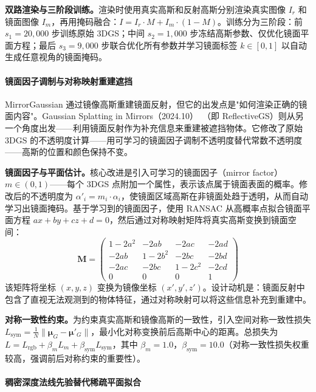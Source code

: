 \textbf{双路渲染与三阶段训练。}渲染时使用真实高斯和反射高斯分别渲染真实图像 $I_r$ 和镜面图像 $I_m$，再用掩码融合：$I = I_r \cdot M + I_m \cdot (1-M)$。训练分为三阶段：前 $s_1=20{,}000$ 步训练原始 3DGS；中间 $s_2=1{,}000$ 步冻结高斯参数、仅优化镜面平面方程；最后 $s_3=9{,}000$ 步联合优化所有参数并学习镜面标签 $k \in [0,1]$ 以自动生成任意视角的镜面掩码。

\paragraph{镜面因子调制与对称映射重建遮挡}

MirrorGaussian 通过镜像高斯重建镜面反射，但它的出发点是"如何渲染正确的镜面内容"。Gaussian Splatting in Mirrors（2024.10）~\cite{2410_01614}（即 ReflectiveGS）则从另一个角度出发——利用镜面反射作为补充信息来重建被遮挡物体。它修改了原始 3DGS 的不透明度计算——用可学习的镜面因子调制不透明度替代常数不透明度——高斯的位置和颜色保持不变。

\textbf{镜面因子与平面估计。}核心改进是引入可学习的镜面因子（mirror factor）$m \in (0,1)$——每个 3DGS 点附加一个属性，表示该点属于镜面表面的概率。修改后的不透明度为 $\alpha'_i = m_i \cdot \alpha_i$，使镜面区域高斯在非镜面处趋于透明，从而自动学习出镜面掩码。基于学习到的镜面因子，使用 RANSAC 从高概率点拟合镜面平面方程 $ax + by + cz + d = 0$，然后通过对称映射矩阵将真实高斯变换到镜面空间：
$$\mathbf{M} = \begin{pmatrix} 1-2a^2 & -2ab & -2ac & -2ad \\ -2ab & 1-2b^2 & -2bc & -2bd \\ -2ac & -2bc & 1-2c^2 & -2cd \\ 0 & 0 & 0 & 1 \end{pmatrix}$$
该矩阵将坐标 $(x,y,z)$ 变换为镜像坐标 $(x',y',z')$。设计动机是：镜面反射中包含了直视无法观测到的物体特征，通过对称映射可以将这些信息补充到重建中。

\textbf{对称一致性约束。}为约束真实高斯和镜像高斯的一致性，引入空间对称一致性损失 $L_{\text{sym}} = \frac{1}{N}\|\boldsymbol{\mu}_G - \boldsymbol{\mu}'_G\|$，最小化对称变换前后高斯中心的距离。总损失为 $L = L_{\text{rgb}} + \beta_m L_m + \beta_{\text{sym}} L_{\text{sym}}$，其中 $\beta_m = 1.0$，$\beta_{\text{sym}} = 10.0$（对称一致性损失权重较高，强调前后对称约束的重要性）。

\paragraph{稠密深度法线先验替代稀疏平面拟合}

